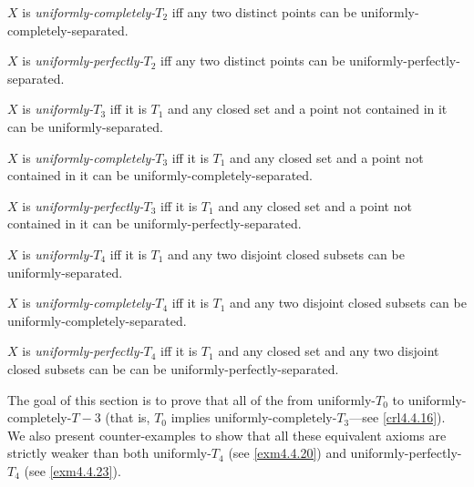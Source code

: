 \begin{dfn}\label{UniformlyCompletelyT2}
$X$ is \emph{uniformly-completely-$T_2$} iff any two distinct points can be uniformly-completely-separated.
\end{dfn}
\begin{dfn}\label{UniformlyPerfectlyT2}
$X$ is \emph{uniformly-perfectly-$T_2$} iff any two distinct points can be uniformly-perfectly-separated.
\end{dfn}
\begin{dfn}[Uniformly-$T_3$]\label{UniformlyT3}
$X$ is \emph{uniformly-$T_3$} iff it is $T_1$ and any closed set and a point not contained in it can be uniformly-separated.
\end{dfn}
\begin{dfn}\label{UniformlyCompletelyT3}
$X$ is \emph{uniformly-completely-$T_3$} iff it is $T_1$ and any closed set and a point not contained in it can be uniformly-completely-separated.
\end{dfn}
\begin{dfn}\label{UniformlyPerfectlyT3}
$X$ is \emph{uniformly-perfectly-$T_3$} iff it is $T_1$ and any closed set and a point not contained in it can be uniformly-perfectly-separated.
\end{dfn}
\begin{dfn}[Uniformly-$T_4$]\label{UniformlyT4}
$X$ is \emph{uniformly-$T_4$} iff it is $T_1$ and any two disjoint closed subsets can be uniformly-separated.
\end{dfn}
\begin{dfn}\label{UniformlyCompletelyT4}
$X$ is \emph{uniformly-completely-$T_4$} iff it is $T_1$ and any two disjoint closed subsets can be uniformly-completely-separated.
\end{dfn}
\begin{dfn}\label{UniformlyPerfectlyT4}
$X$ is \emph{uniformly-perfectly-$T_4$} iff it is $T_1$ and any closed set and any two disjoint closed subsets can be can be uniformly-perfectly-separated.
\end{dfn}
The goal of this section is to prove that all of the from uniformly-$T_0$ to uniformly-completely-$T-3$ (that is, $T_0$ implies uniformly-completely-$T_3$---see \cref{crl4.4.16}).  We also present counter-examples to show that all these equivalent axioms are strictly weaker than both uniformly-$T_4$ (see \cref{exm4.4.20}) and uniformly-perfectly-$T_4$ (see \cref{exm4.4.23}).

